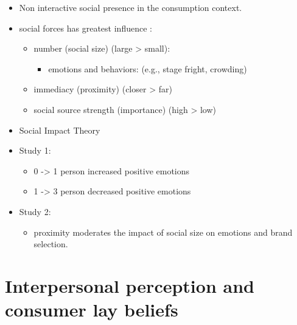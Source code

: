 \documentclass[
]{book}
\providecommand{\tightlist}{%
  \setlength{\itemsep}{0pt}\setlength{\parskip}{0pt}}
\begin{document}
\citep{argo2005}

\begin{itemize}
\item
  Non interactive social presence in the consumption context.
\item
  social forces has greatest influence \citep{latan?1981}:

  \begin{itemize}
  \item
    number (social size) (large \textgreater{} small):

    \begin{itemize}
    \tightlist
    \item
      emotions and behaviors: (e.g., stage fright, crowding)
    \end{itemize}
  \item
    immediacy (proximity) (closer \textgreater{} far)
  \item
    social source strength (importance) (high \textgreater{} low)
  \end{itemize}
\item
  Social Impact Theory
\item
  Study 1:

  \begin{itemize}
  \item
    0 -\textgreater{} 1 person increased positive emotions
  \item
    1 -\textgreater{} 3 person decreased positive emotions
  \end{itemize}
\item
  Study 2:

  \begin{itemize}
  \tightlist
  \item
    proximity moderates the impact of social size on emotions and brand selection.
  \end{itemize}
\end{itemize}

\hypertarget{interpersonal-perception-and-consumer-lay-beliefs}{%
\section{Interpersonal perception and consumer lay beliefs}\label{interpersonal-perception-and-consumer-lay-beliefs}}

\citep{folkes2003}
\end{document}
